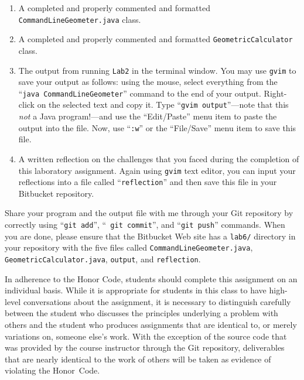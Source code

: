 \vspace*{-.05in}
\begin{enumerate}
    \setlength{\itemsep}{0pt}
      \item A completed and properly commented and formatted {\tt CommandLineGeometer.java} class.

        \item A completed and properly commented and formatted {\tt GeometricCalculator} class.

        \item The output from running {\tt Lab2} in the terminal window. You may use {\tt gvim} to save your output as
          follows: using the mouse, select everything from the ``{\tt java CommandLineGeometer}'' command to the end of
          your output.  Right-click on the selected text and copy it.  Type ``{\tt gvim output}''---note that this {\em
            not} a Java program!---and use the ``Edit/Paste'' menu item to paste the output into the file.  Now, use
          ``{\tt :w}'' or the ``File/Save'' menu item to save this file.

        \item A written reflection on the challenges that you faced during the completion of this laboratory assignment.
          Again using {\tt gvim} text editor, you can input your reflections into a file called ``{\tt reflection}'' and
          then save this file in your Bitbucket repository.

\end{enumerate}
\vspace*{-.05in}

Share your program and the output file with me through your Git repository by correctly using ``{\tt git add}'', ``{\tt
  git commit}'', and ``{\tt git push}'' commands. When you are done, please ensure that the Bitbucket Web site has a
{\tt lab6/} directory in your repository with the five files called {\tt CommandLineGeometer.java}, {\tt
  GeometricCalculator.java}, {\tt output}, and {\tt reflection}. 


In adherence to the Honor Code, students should complete this assignment on an individual basis. While it is appropriate
for students in this class to have high-level conversations about the assignment, it is necessary to distinguish
carefully between the student who discusses the principles underlying a problem with others and the student who produces
assignments that are identical to, or merely variations on, someone else's work.  With the exception of the source code
that was provided by the course instructor through the Git repository, deliverables that are nearly identical to the
work of others will be taken as evidence of violating the \mbox{Honor Code}.  


